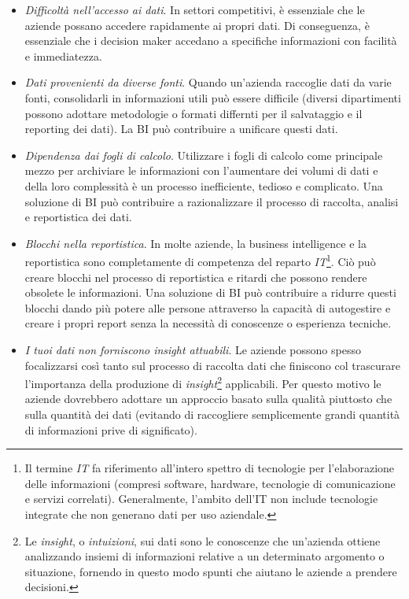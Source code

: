 \begin{itemize}
    \item \textit{Difficoltà nell'accesso ai dati}. In settori competitivi, è essenziale che le aziende possano accedere rapidamente ai propri dati. Di conseguenza, è essenziale che i decision maker accedano a specifiche informazioni con facilità e immediatezza.
    \item \textit{Dati provenienti da diverse fonti}. Quando un'azienda raccoglie dati da varie fonti, consolidarli in informazioni utili può essere difficile (diversi dipartimenti possono adottare metodologie o formati differnti per il salvataggio e il reporting dei dati). La BI può contribuire a unificare questi dati.
    \item \textit{Dipendenza dai fogli di calcolo}. Utilizzare i fogli di calcolo come principale mezzo per archiviare le informazioni con l'aumentare dei volumi di dati e della loro complessità è un processo inefficiente, tedioso e complicato. Una soluzione di BI può contribuire a razionalizzare il processo di raccolta, analisi e reportistica dei dati.
    \item \textit{Blocchi nella reportistica}. In molte aziende, la business intelligence e la reportistica sono completamente di competenza del reparto \textit{IT}\footnote{Il termine \textit{IT} fa riferimento all'intero spettro di tecnologie per l'elaborazione delle informazioni (compresi software, hardware, tecnologie di comunicazione e servizi correlati). Generalmente, l'ambito dell'IT non include tecnologie integrate che non generano dati per uso aziendale.\cite{gartner_it}}. Ciò può creare blocchi nel processo di reportistica e ritardi che possono rendere obsolete le informazioni. Una soluzione di BI può contribuire a ridurre questi blocchi dando più potere alle persone attraverso la capacità di autogestire e creare i propri report senza la necessità di conoscenze o esperienza tecniche.
    \item \textit{I tuoi dati non forniscono insight attuabili}. Le aziende possono spesso focalizzarsi così tanto sul processo di raccolta dati che finiscono col trascurare l'importanza della produzione di \textit{insight}\footnote{Le \textit{insight}, o \textit{intuizioni}, sui dati sono le conoscenze che un'azienda ottiene analizzando insiemi di informazioni relative a un determinato argomento o situazione, fornendo in questo modo spunti che aiutano le aziende a prendere decisioni.\cite{datarobot_insight}} applicabili. Per questo motivo le aziende dovrebbero adottare un approccio basato sulla qualità piuttosto che sulla quantità dei dati (evitando di raccogliere semplicemente grandi quantità di informazioni prive di significato).

\end{itemize}
